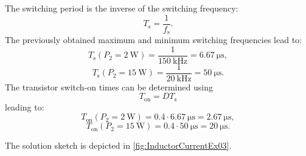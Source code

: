  \begin{solutionblock}
 The switching period is the inverse of the switching frequency: 
 \begin{equation}
    T_\mathrm{s} = \frac{1}{f_\mathrm{s}}. \label{switching frequency}
 \end{equation}
 The previously obtained maximum and minimum switching frequencies lead to:
 \begin{equation}
    T_\mathrm{s}(P_\mathrm{2}=\SI{2}{\watt}) = \frac{1}{\SI{150}{\kilo \hertz}}= \SI{6.67}{\micro \s},
 \end{equation}
 \begin{equation}
    T_\mathrm{s}(P_\mathrm{2}=\SI{15}{\watt}) = \frac{1}{\SI{20}{\kilo \hertz}}= \SI{50}{\micro \s}.
 \end{equation}
 The transistor switch-on times can be determined using 
 \begin{equation}
    T_\mathrm{on} = D T_\mathrm{s} \label{absolut value switch-on-times}
 \end{equation}
 leading to:
 \begin{equation}
    T_\mathrm{on}(P_\mathrm{2}=\SI{2}{\watt}) = 0.4 \cdot \SI{6.67}{\micro \s} = \SI{2.67}{\micro \s},
 \end{equation}
 \begin{equation}
    T_\mathrm{on}(P_\mathrm{2}=\SI{15}{\watt}) = 0.4 \cdot \SI{50}{\micro \s}= \SI{20}{\micro \s}.
 \end{equation}
 \end{solutionblock}

\begin{solutionblock}
    The solution sketch is depicted in \autoref{fig:InductorCurrentEx03}.
       
\end{solutionblock}
    
 
